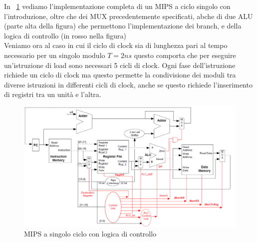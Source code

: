 In \figurename~\ref{fig:monocic} vediamo l'implementazione completa di un MIPS a ciclo singolo con l'introduzione, oltre che dei MUX precedentemente specificati, abche di due ALU (parte alta della figura) che permettono l'implementazione dei branch, e della logica di controllo (in rosso nella figura)\\
Veniamo ora al caso in cui il ciclo di clock sia di lunghezza pari al tempo necessario per un singolo modulo $T = 2 ns$ questo comporta che per eseguire un'istruzione di load sono necessari 5 cicli di clock. Ogni fase dell'istruzione richiede un ciclo di clock ma questo permette la condivisione dei moduli tra diverse istruzioni in differenti cicli di clock, anche se questo richiede l'inserimento di registri tra un unità  e l'altra.
\begin{figure}[!Hptb]
\centering
\includegraphics[scale=0.67, angle=90]{img/monocic.png}
\caption{MIPS a singolo ciclo con logica di controllo}\label{fig:monocic}
\end{figure}
